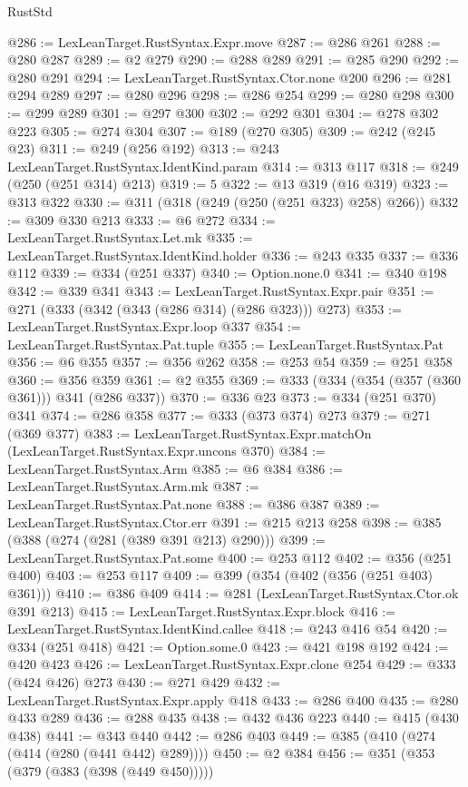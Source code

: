 \begin{lexlean}{RustStd}
\begin{coremodule}
{\begin{coremodule}
{{{{{{{{@286 := LexLeanTarget.RustSyntax.Expr.move
@287 := @286 @261
@288 := @280 @287
@289 := @2 @279
@290 := @288 @289
@291 := @285 @290
@292 := @280 @291
@294 := LexLeanTarget.RustSyntax.Ctor.none @200
@296 := @281 @294 @289
@297 := @280 @296
@298 := @286 @254
@299 := @280 @298
@300 := @299 @289
@301 := @297 @300
@302 := @292 @301
@304 := @278 @302 @223
@305 := @274 @304
@307 := @189 (@270 @305)
@309 := @242 (@245 @23)
@311 := @249 (@256 @192)
@313 := @243 LexLeanTarget.RustSyntax.IdentKind.param
@314 := @313 @117
@318 := @249 (@250 (@251 @314) @213)
@319 := 5
@322 := @13 @319 (@16 @319)
@323 := @313 @322
@330 := @311 (@318 (@249 (@250 (@251 @323) @258) @266))
@332 := @309 @330 @213
@333 := @6 @272
@334 := LexLeanTarget.RustSyntax.Let.mk
@335 := LexLeanTarget.RustSyntax.IdentKind.holder
@336 := @243 @335
@337 := @336 @112
@339 := @334 (@251 @337)
@340 := Option.none.{0}
@341 := @340 @198
@342 := @339 @341
@343 := LexLeanTarget.RustSyntax.Expr.pair
@351 := @271 (@333 (@342 (@343 (@286 @314) (@286 @323))) @273)
@353 := LexLeanTarget.RustSyntax.Expr.loop @337
@354 := LexLeanTarget.RustSyntax.Pat.tuple
@355 := LexLeanTarget.RustSyntax.Pat
@356 := @6 @355
@357 := @356 @262
@358 := @253 @54
@359 := @251 @358
@360 := @356 @359
@361 := @2 @355
@369 := @333 (@334 (@354 (@357 (@360 @361))) @341 (@286 @337))
@370 := @336 @23
@373 := @334 (@251 @370) @341
@374 := @286 @358
@377 := @333 (@373 @374) @273
@379 := @271 (@369 @377)
@383 := LexLeanTarget.RustSyntax.Expr.matchOn (LexLeanTarget.RustSyntax.Expr.uncons @370)
@384 := LexLeanTarget.RustSyntax.Arm
@385 := @6 @384
@386 := LexLeanTarget.RustSyntax.Arm.mk
@387 := LexLeanTarget.RustSyntax.Pat.none
@388 := @386 @387
@389 := LexLeanTarget.RustSyntax.Ctor.err
@391 := @215 @213 @258
@398 := @385 (@388 (@274 (@281 (@389 @391 @213) @290)))
@399 := LexLeanTarget.RustSyntax.Pat.some
@400 := @253 @112
@402 := @356 (@251 @400)
@403 := @253 @117
@409 := @399 (@354 (@402 (@356 (@251 @403) @361)))
@410 := @386 @409
@414 := @281 (LexLeanTarget.RustSyntax.Ctor.ok @391 @213)
@415 := LexLeanTarget.RustSyntax.Expr.block
@416 := LexLeanTarget.RustSyntax.IdentKind.callee
@418 := @243 @416 @54
@420 := @334 (@251 @418)
@421 := Option.some.{0}
@423 := @421 @198 @192
@424 := @420 @423
@426 := LexLeanTarget.RustSyntax.Expr.clone @254
@429 := @333 (@424 @426) @273
@430 := @271 @429
@432 := LexLeanTarget.RustSyntax.Expr.apply @418
@433 := @286 @400
@435 := @280 @433 @289
@436 := @288 @435
@438 := @432 @436 @223
@440 := @415 (@430 @438)
@441 := @343 @440
@442 := @286 @403
@449 := @385 (@410 (@274 (@414 (@280 (@441 @442) @289))))
@450 := @2 @384
@456 := @351 (@353 (@379 (@383 (@398 (@449 @450)))))
}}}}}}}}
\end{coremodule}}
\end{coremodule}
\end{lexlean}
